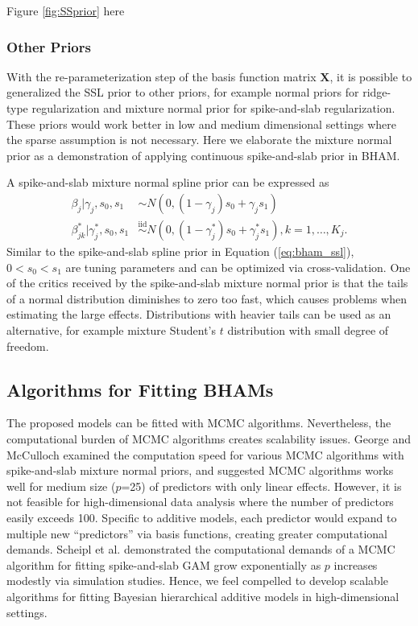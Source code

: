 \documentclass[AMA,STIX1COL,]{WileyNJD-v2}
\begin{document}
\begin{center}
Figure \ref{fig:SSprior} here
\end{center}

\subsubsection{Other Priors}

With the re-parameterization step of the basis function matrix
\(\boldsymbol{X}\), it is possible to generalized the SSL prior to other
priors, for example normal priors for ridge-type regularization and
mixture normal prior for spike-and-slab regularization. These priors
would work better in low and medium dimensional settings where the
sparse assumption is not necessary. Here we elaborate the mixture normal
prior as a demonstration of applying continuous spike-and-slab prior in
BHAM.

A spike-and-slab mixture normal spline prior can be expressed as
\begin{align*}
  \beta_{j} |\gamma_{j},s_0,s_1 &\sim N(0,(1-\gamma_{j}) s_0 + \gamma_{j} s_1)\\
  \beta^*_{jk} | \gamma^*_{j},s_0,s_1 &\overset{\text{iid}}{\sim}N(0,(1-\gamma^*_{j}) s_0 + \gamma^*_{j} s_1), k=1,\dots, K_j.
\end{align*} Similar to the spike-and-slab spline prior in Equation
(\ref{eq:bham_ssl}), \(0 < s_0 < s_1\) are tuning parameters and can be
optimized via cross-validation. One of the critics received by the
spike-and-slab mixture normal prior is that the tails of a normal
distribution diminishes to zero too fast, which causes problems when
estimating the large effects. Distributions with heavier tails can be
used as an alternative, for example mixture Student's \(t\) distribution
with small degree of freedom.

\subsection{Algorithms for Fitting BHAMs}

The proposed models can be fitted with MCMC algorithms. Nevertheless,
the computational burden of MCMC algorithms creates scalability issues.
George and McCulloch\citep{George1997} examined the computation speed
for various MCMC algorithms with spike-and-slab mixture normal priors,
and suggested MCMC algorithms works well for medium size (\(p\)=25) of
predictors with only linear effects. However, it is not feasible for
high-dimensional data analysis where the number of predictors easily
exceeds 100. Specific to additive models, each predictor would expand to
multiple new ``predictors'' via basis functions, creating greater
computational demands. Scheipl et al. \citep{Scheipl2013} demonstrated
the computational demands of a MCMC algorithm for fitting spike-and-slab
GAM grow exponentially as \(p\) increases modestly via simulation
studies. Hence, we feel compelled to develop scalable algorithms for
fitting Bayesian hierarchical additive models in high-dimensional
settings.
\end{document}
